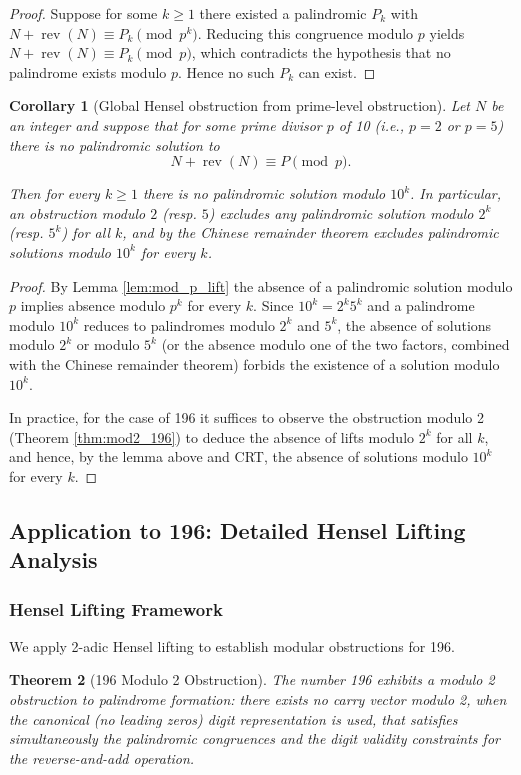 \documentclass[11pt,a4paper]{article}
\theoremstyle{plain}
\newtheorem{theorem}{Theorem}[section]
\newtheorem{corollary}[theorem]{Corollary}
\theoremstyle{definition}
\begin{document}
\begin{proof}
Suppose for some $k\ge1$ there existed a palindromic $P_k$ with
$N+\operatorname{rev}(N)\equiv P_k\pmod{p^k}$. Reducing this congruence modulo $p$ yields
$N+\operatorname{rev}(N)\equiv P_k\pmod p$, which contradicts the hypothesis that no palindrome exists modulo $p$. Hence no such $P_k$ can exist.
\end{proof}
%
\begin{corollary}[Global Hensel obstruction from prime-level obstruction]
Let $N$ be an integer and suppose that for some prime divisor $p$ of 10 (i.e., $p=2$ or $p=5$) there is no palindromic solution to
\[N+\operatorname{rev}(N)\equiv P\pmod p.\]

Then for every $k\ge1$ there is no palindromic solution modulo $10^k$. In particular, an obstruction modulo $2$ (resp. $5$) excludes any palindromic solution modulo $2^k$ (resp. $5^k$) for all $k$, and by the Chinese remainder theorem excludes palindromic solutions modulo $10^k$ for every $k$.
\end{corollary}
%
\begin{proof}
By Lemma \ref{lem:mod_p_lift} the absence of a palindromic solution modulo $p$ implies absence modulo $p^k$ for every $k$. Since $10^k=2^k5^k$ and a palindrome modulo $10^k$ reduces to palindromes modulo $2^k$ and $5^k$, the absence of solutions modulo $2^k$ or modulo $5^k$ (or the absence modulo one of the two factors, combined with the Chinese remainder theorem) forbids the existence of a solution modulo $10^k$.

In practice, for the case of 196 it suffices to observe the obstruction modulo 2 (Theorem \ref{thm:mod2_196}) to deduce the absence of lifts modulo $2^k$ for all $k$, and hence, by the lemma above and CRT, the absence of solutions modulo $10^k$ for every $k$.
\end{proof}
%
\subsection{Application to 196: Detailed Hensel Lifting Analysis}

\subsubsection{Hensel Lifting Framework}

We apply 2-adic Hensel lifting to establish modular obstructions for 196.

\begin{theorem}[196 Modulo 2 Obstruction]
The number 196 exhibits a modulo 2 obstruction to palindrome formation: there exists no carry vector modulo 2, when the canonical (no leading zeros) digit representation is used, that satisfies simultaneously the palindromic congruences and the digit validity constraints for the reverse-and-add operation.
\end{theorem}
\end{document}
